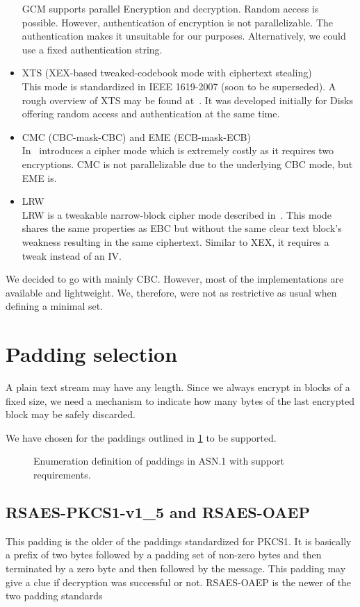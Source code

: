 \begin{itemize}
	GCM supports parallel Encryption and decryption. Random access is possible. However, authentication of encryption is not parallelizable. The authentication makes it unsuitable for our purposes. Alternatively, we could use a fixed authentication string.
	\item XTS (XEX-based tweaked-codebook mode with ciphertext stealing)\\
	This mode is standardized in IEEE 1619-2007 (soon to be superseded). A rough overview of XTS may be found at~\cite{Martin2010}. It was developed initially for Disks offering random access and authentication at the same time. 
	\item CMC (CBC-mask-CBC) and EME (ECB-mask-ECB)\\ 
	In~\cite{Halevi:2003} \citeauthor{Halevi:2003} introduces a cipher mode which is extremely costly as it requires two encryptions. CMC is not parallelizable due to the underlying CBC mode, but EME is. 
	\item LRW\\
	LRW is a tweakable narrow-block cipher mode described in~\cite{tschorsch:translayeranon}. This mode shares the same properties as EBC but without the same clear text block's weakness resulting in the same ciphertext. Similar to XEX, it requires a tweak instead of an IV.
\end{itemize}

We decided to go with mainly CBC. However, most of the implementations are available and lightweight. We, therefore, were not as restrictive as usual when defining a minimal set.

\section{Padding selection}
A plain text stream may have any length. Since we always encrypt in blocks of a fixed size, we need a mechanism to indicate how many bytes of the last encrypted block may be safely discarded. 

We have chosen for the paddings outlined in \cref{fig:defPaddings} to be supported.
\begin{figure}[ht]
	
	\caption{Enumeration definition of paddings in ASN.1 with support requirements.}
	\label{fig:defPaddings}
\end{figure}

\subsection{RSAES-PKCS1-v1\_5 and RSAES-OAEP}
This padding is the older of the paddings standardized for PKCS1. It is basically a prefix of two bytes followed by a padding set of non-zero bytes and then terminated by a zero byte and then followed by the message. This padding may give a clue if decryption was successful or not. RSAES-OAEP is the newer of the two padding standards 

